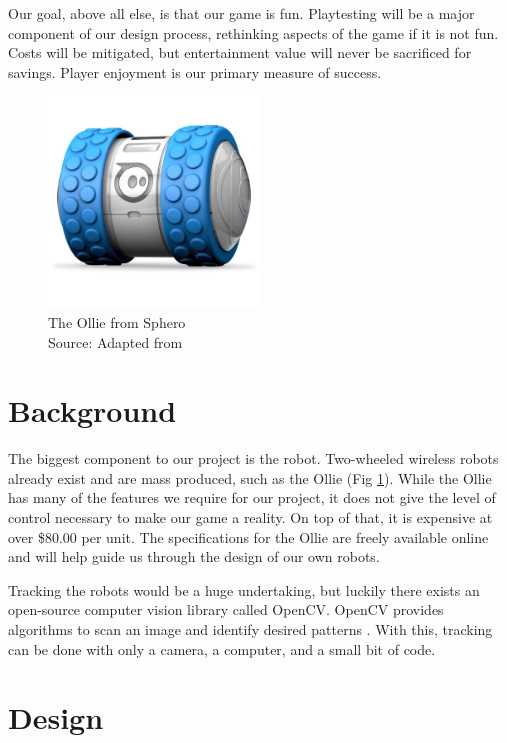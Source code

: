 \documentclass[11pt]{ieeeconf}
\begin{document}
Our goal, above all else, is that our game is fun. Playtesting will be a major component of our design process, rethinking aspects of the game if it is not fun. Costs will be mitigated, but entertainment value will never be sacrificed for savings. Player enjoyment is our primary measure of success.

\begin{figure}[H]
\centering
\captionsetup{justification=centering}
\includegraphics[width=0.5\textwidth]{images/SumoBot.png}
\caption{The Ollie from Sphero\\Source: Adapted from \cite{ollie:19}}
\label{Ollie}
\end{figure}

\section{Background}
The biggest component to our project is the robot. Two-wheeled wireless robots already exist and are mass produced, such as the Ollie (Fig \ref{Ollie}). While the Ollie has many of the features we require for our project, it does not give the level of control necessary to make our game a reality. On top of that, it is expensive at over \$80.00 per unit. The specifications for the Ollie are freely available online and will help guide us through the design of our own robots.


Tracking the robots would be a huge undertaking, but luckily there exists an open-source computer vision library called OpenCV. OpenCV provides algorithms to scan an image and identify desired patterns \cite{opencv:19}. With this, tracking can be done with only a camera, a computer, and a small bit of code. 

\section{Design}
\end{document}

